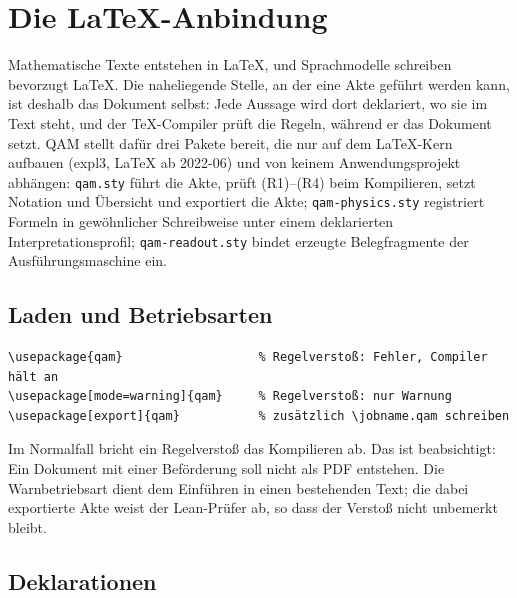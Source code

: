 \section{Die \LaTeX-Anbindung}\label{sec:latex}

Mathematische Texte entstehen in \LaTeX, und Sprachmodelle schreiben bevorzugt \LaTeX. Die naheliegende Stelle, an der eine Akte geführt
werden kann, ist deshalb das Dokument selbst: Jede Aussage wird dort deklariert, wo sie im Text steht, und der \TeX-Compiler prüft die
Regeln, während er das Dokument setzt. QAM stellt dafür drei Pakete bereit, die nur auf dem \LaTeX-Kern aufbauen (expl3, \LaTeX{} ab
2022-06) und von keinem Anwendungsprojekt abhängen: \texttt{qam.sty} führt die Akte, prüft (R1)--(R4) beim Kompilieren, setzt Notation
und Übersicht und exportiert die Akte; \texttt{qam-physics.sty} registriert Formeln in gewöhnlicher Schreibweise unter einem deklarierten
Interpretationsprofil; \texttt{qam-readout.sty} bindet erzeugte Belegfragmente der Ausführungsmaschine ein.

\subsection{Laden und Betriebsarten}

\begin{lstlisting}
\usepackage{qam}                   % Regelverstoß: Fehler, Compiler hält an
\usepackage[mode=warning]{qam}     % Regelverstoß: nur Warnung
\usepackage[export]{qam}           % zusätzlich \jobname.qam schreiben
\end{lstlisting}
Im Normalfall bricht ein Regelverstoß das Kompilieren ab. Das ist beabsichtigt: Ein Dokument mit einer Beförderung soll nicht als PDF
entstehen. Die Warnbetriebsart dient dem Einführen in einen bestehenden Text; die dabei exportierte Akte weist der Lean-Prüfer ab, so
dass der Verstoß nicht unbemerkt bleibt.

\subsection{Deklarationen}

